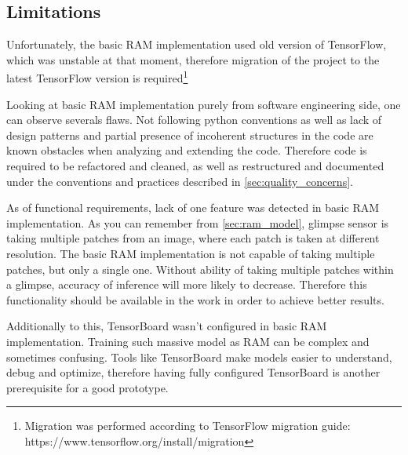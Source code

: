 \subsection{Limitations}
Unfortunately, the basic RAM implementation used old version of TensorFlow,
which was unstable at that moment, therefore migration of the project
to the latest TensorFlow version is required\footnote{
	Migration was performed according to TensorFlow migration
	guide: https://www.tensorflow.org/install/migration
}

Looking at basic RAM implementation purely from software engineering side,
one can observe severals flaws. Not following python conventions as well
as lack of design patterns and partial presence of incoherent structures in the code
are known obstacles when analyzing and extending the code.
Therefore code is required to be refactored and cleaned,
as well as restructured and documented under the conventions and
practices described in \autoref{sec:quality_concerns}.


As of functional requirements, lack of one feature was detected in basic RAM implementation.
As you can remember from \autoref{sec:ram_model}, glimpse sensor is taking
multiple patches from an image, where each patch is taken at different resolution.
The basic RAM implementation is not capable of taking multiple patches,
but only a single one. Without ability of taking multiple patches within a glimpse,
accuracy of inference will more likely to decrease. Therefore this functionality
should be available in the work in order to achieve better results.

Additionally to this, TensorBoard wasn't configured in basic RAM implementation.
Training such massive model as RAM can be complex and sometimes confusing.
Tools like TensorBoard make models easier to understand, debug
and optimize, therefore having fully configured TensorBoard is another
prerequisite for a good prototype.









